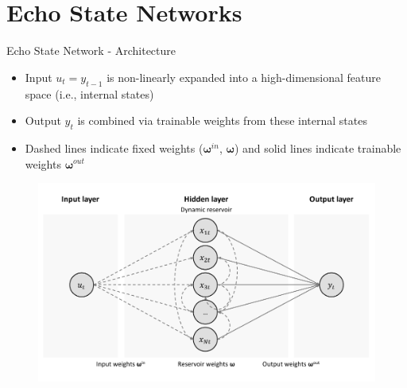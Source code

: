 \documentclass[aspectratio=169]{beamer}
\begin{document}
\section{Echo State Networks}



\begin{frame}[t]{Echo State Network - Architecture}
    \begin{minipage}[t]{0.3\textwidth}
        \vspace{0pt}
        \begin{itemize}
			\item Input $u_{t} = y_{t-1}$ is non-linearly expanded into a high-dimensional feature space (i.e., internal states)
			\item Output $y_{t}$ is combined via trainable weights from these internal states
			\item Dashed lines indicate fixed weights ($\boldsymbol{\omega}^{in}$, $\boldsymbol{\omega}$) and solid lines indicate trainable weights $\boldsymbol{\omega}^{out}$
        \end{itemize}
    \end{minipage}%
    \hfill
    \begin{minipage}[t]{0.7\textwidth}
        \vspace{0pt}
 		\begin{figure}[H]
		\center
			\includegraphics[scale=0.6]{figures/figure_04_architecture.pdf}
		\end{figure}
    \end{minipage}
\end{frame}
\end{document}
